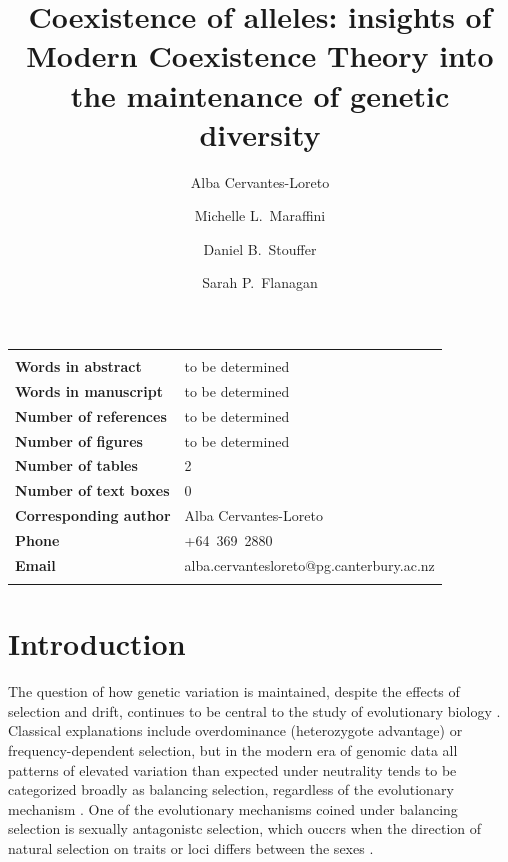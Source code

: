 \documentclass[12pt]{article}
\title{Coexistence of alleles: insights of Modern Coexistence Theory into the maintenance of genetic diversity}
\author[1]{Alba Cervantes-Loreto}
\author[1]{Michelle L.\ Maraffini}
\author[1]{Daniel B.\ Stouffer}
\author[1]{Sarah P.\ Flanagan}
\affil[1]{Centre for Integrative Ecology, School of Biological Sciences\\ University of Canterbury, Christchurch 8140, New Zealand}
\date{}
\newenvironment{ecolettcover}{\maketitle}{\clearpage}
\begin{document}
\linenumbers
\baselineskip30pt
\maketitle

\begin{ecolettcover}

\begin{center}
\begin{tabular}{ll}
\hline \\

\bf{Words in abstract}         & to be determined \\
\bf{Words in manuscript}       & to be determined\\
\bf{Number of references}      & to be determined  \\
\bf{Number of figures}			& to be determined \\
\bf{Number of tables} 			& 2 \\
\bf{Number of text boxes}		& 0 \\
\bf{Corresponding author}      & Alba Cervantes-Loreto \\
\bf{Phone}                     & +64~369~2880 \\

\bf{Email}                     & alba.cervantesloreto@pg.canterbury.ac.nz \\
                                                                        \\
\hline
\end{tabular}
\end{center}

\maketitle

\end{ecolettcover}
\section{Introduction}

The question of how genetic variation is maintained, despite the effects of selection and drift, continues to be central to the study of evolutionary biology \citep{walsh_evolution_2018}. Classical explanations include overdominance (heterozygote advantage) or frequency-dependent selection, but in the modern era of genomic data all patterns of elevated variation than expected under neutrality tends to be categorized broadly as balancing selection, regardless of the evolutionary mechanism \citep{mitchell-olds_which_2007}.  One of the evolutionary mechanisms coined under balancing selection is sexually antagonistc selection, which ouccrs when the direction of natural selection on traits or loci differs between the sexes \citep{connallon2018environmental}.
\end{document}
